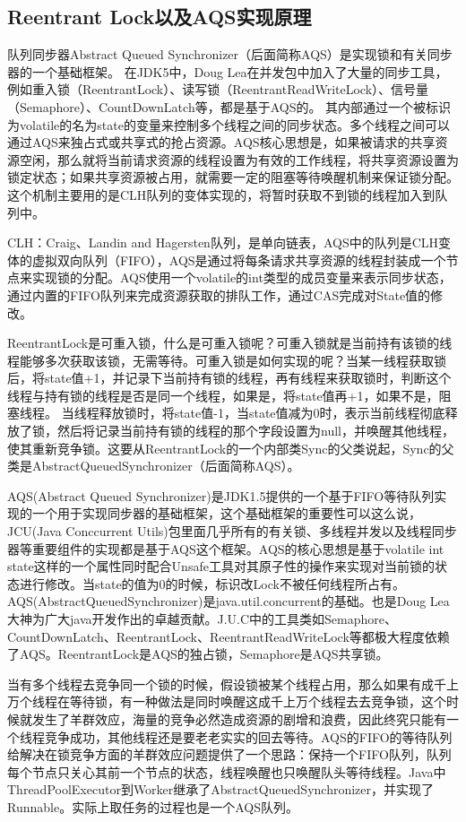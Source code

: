 \documentclass[../../../interview-questions.tex]{subfiles}
\begin{document}
\subsection{Reentrant Lock以及AQS实现原理}

队列同步器Abstract Queued Synchronizer（后面简称AQS）是实现锁和有关同步器的一个基础框架。
在JDK5中，Doug Lea在并发包中加入了大量的同步工具，例如重入锁（ReentrantLock）、读写锁（ReentrantReadWriteLock）、信号量（Semaphore）、CountDownLatch等，都是基于AQS的。
其内部通过一个被标识为volatile的名为state的变量来控制多个线程之间的同步状态。多个线程之间可以通过AQS来独占式或共享式的抢占资源。AQS核心思想是，如果被请求的共享资源空闲，那么就将当前请求资源的线程设置为有效的工作线程，将共享资源设置为锁定状态；如果共享资源被占用，就需要一定的阻塞等待唤醒机制来保证锁分配。这个机制主要用的是CLH队列的变体实现的，将暂时获取不到锁的线程加入到队列中。

CLH：Craig、Landin and Hagersten队列，是单向链表，AQS中的队列是CLH变体的虚拟双向队列（FIFO），AQS是通过将每条请求共享资源的线程封装成一个节点来实现锁的分配。AQS使用一个volatile的int类型的成员变量来表示同步状态，通过内置的FIFO队列来完成资源获取的排队工作，通过CAS完成对State值的修改。

ReentrantLock是可重入锁，什么是可重入锁呢？可重入锁就是当前持有该锁的线程能够多次获取该锁，无需等待。可重入锁是如何实现的呢？当某一线程获取锁后，将state值+1，并记录下当前持有锁的线程，再有线程来获取锁时，判断这个线程与持有锁的线程是否是同一个线程，如果是，将state值再+1，如果不是，阻塞线程。
当线程释放锁时，将state值-1，当state值减为0时，表示当前线程彻底释放了锁，然后将记录当前持有锁的线程的那个字段设置为null，并唤醒其他线程，使其重新竞争锁。这要从ReentrantLock的一个内部类Sync的父类说起，Sync的父类是AbstractQueuedSynchronizer（后面简称AQS）。

AQS(Abstract Queued Synchronizer)是JDK1.5提供的一个基于FIFO等待队列实现的一个用于实现同步器的基础框架，这个基础框架的重要性可以这么说，JCU(Java Conccurrent Utils)包里面几乎所有的有关锁、多线程并发以及线程同步器等重要组件的实现都是基于AQS这个框架。AQS的核心思想是基于volatile int state这样的一个属性同时配合Unsafe工具对其原子性的操作来实现对当前锁的状态进行修改。当state的值为0的时候，标识改Lock不被任何线程所占有。AQS(AbstractQueuedSynchronizer)是java.util.concurrent的基础。也是Doug Lea大神为广大java开发作出的卓越贡献。J.U.C中的工具类如Semaphore、CountDownLatch、ReentrantLock、ReentrantReadWriteLock等都极大程度依赖了AQS。ReentrantLock是AQS的独占锁，Semaphore是AQS共享锁。

当有多个线程去竞争同一个锁的时候，假设锁被某个线程占用，那么如果有成千上万个线程在等待锁，有一种做法是同时唤醒这成千上万个线程去去竞争锁，这个时候就发生了羊群效应，海量的竞争必然造成资源的剧增和浪费，因此终究只能有一个线程竞争成功，其他线程还是要老老实实的回去等待。AQS的FIFO的等待队列给解决在锁竞争方面的羊群效应问题提供了一个思路：保持一个FIFO队列，队列每个节点只关心其前一个节点的状态，线程唤醒也只唤醒队头等待线程。Java中ThreadPoolExecutor到Worker继承了AbstractQueuedSynchronizer，并实现了Runnable。实际上取任务的过程也是一个AQS队列。
\end{document}
